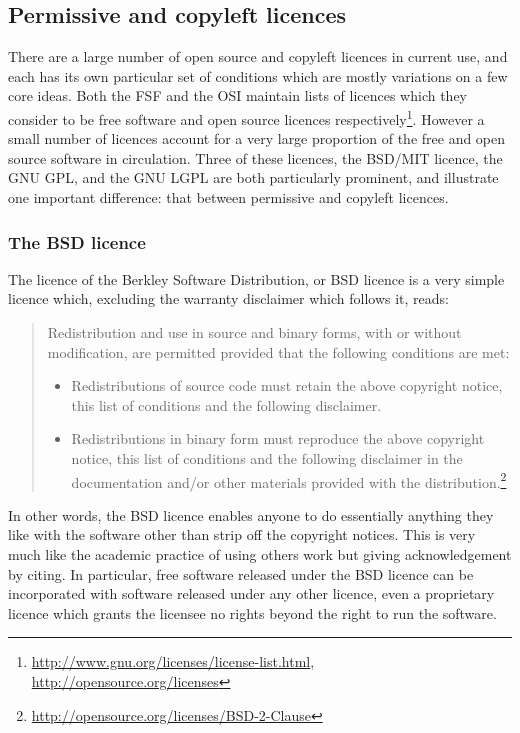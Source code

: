 \documentclass[a4paper,12pt]{article}
\begin{document}
\subsection{Permissive and copyleft licences}

There are a large number of open source and copyleft licences in current
use, and each has its own particular set of conditions which are mostly
variations on a few core ideas. Both the FSF and the OSI maintain lists of
licences which they consider to be free software and open source licences
respectively\footnote{\url{http://www.gnu.org/licenses/license-list.html}, \url{http://opensource.org/licenses}}.
However a small
number of licences account for a very large proportion of the free and open
source software in circulation. Three of these licences, the BSD/MIT
licence, the GNU GPL, and the GNU LGPL are both particularly prominent, and
illustrate one important difference: that between permissive and copyleft licences.

\subsubsection{The BSD licence}

The licence of the Berkley Software Distribution, or BSD licence is a very
simple licence which, excluding the warranty disclaimer which follows it,
reads:
\begin{quotation}
  Redistribution and use in source and binary forms, with or without
  modification, are permitted provided that the following conditions are
  met:
  \begin{itemize}
  \item Redistributions of source code must retain the above copyright
    notice, this list of conditions and the following disclaimer.
  \item Redistributions in binary form must reproduce the above copyright
    notice, this list of conditions and the following disclaimer in the
    documentation and/or other materials provided with the
    distribution.\footnote{\url{http://opensource.org/licenses/BSD-2-Clause}}
  \end{itemize}
\end{quotation}
In other words, the BSD licence enables anyone to do essentially anything
they like with the software other than strip off the copyright notices. This
is very much like the academic practice of using others work but giving
acknowledgement by citing. In particular, free software released under the
BSD licence can be incorporated with software released under any other
licence, even a proprietary licence which grants the licensee no rights
beyond the right to run the software. 
\end{document}
